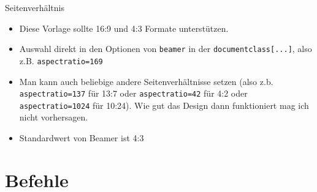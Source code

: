 \documentclass[german,10pt,xcolor=colortbl,compress
]{beamer}
\begin{document}
\begin{frame}{Seitenverhältnis}
	\begin{itemize}
		\item Diese Vorlage sollte 16:9 und 4:3 Formate unterstützen.
		\item Auswahl direkt in den Optionen von \lstinline!beamer! in der \lstinline!documentclass[...]!, also z.B. \lstinline!aspectratio=169!
		\item Man kann auch beliebige andere Seitenverhältnisse setzen (also z.b. \lstinline!aspectratio=137! für 13:7 oder \lstinline!aspectratio=42! für 4:2 oder \lstinline!aspectratio=1024! für 10:24). Wie gut das Design dann funktioniert mag ich nicht vorhersagen.
		\item Standardwert von Beamer ist 4:3
	\end{itemize}
\end{frame}
\section{Befehle}
\end{document}
